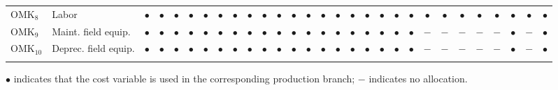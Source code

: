 \documentclass[12pt]{article}
\begin{document}
\begin{table}[H]
\begin{threeparttable}
{\begin{tabular}{llccccccccccccccccccccccccccc}
OMK$_8$    & Labor                 & $\bullet$ & $\bullet$ & $\bullet$ & $\bullet$ & $\bullet$ & $\bullet$ & $\bullet$ & $\bullet$ & $\bullet$ & $\bullet$ & $\bullet$ & $\bullet$ & $\bullet$ & $\bullet$ & $\bullet$ & $\bullet$ & $\bullet$ & $\bullet$ & $\bullet$ & $\bullet$ & $\bullet$ & $\bullet$ & $\bullet$ & $\bullet$ & $\bullet$ & $\bullet$ & $\bullet$ \\
OMK$_9$    & Maint. field equip.    & $\bullet$ & $\bullet$ & $\bullet$ & $\bullet$ & $\bullet$ & $\bullet$ & $\bullet$ & $\bullet$ & $\bullet$ & $\bullet$ & $\bullet$ & $\bullet$ & $\bullet$ & $\bullet$ & $\bullet$ & $\bullet$ & $\bullet$ & $\bullet$ & $\bullet$ & $-$  & $-$  & $-$  & $-$  & $-$  & $\bullet$ & $-$  & $\bullet$ \\
OMK$_{10}$ & Deprec. field equip.   & $\bullet$ & $\bullet$ & $\bullet$ & $\bullet$ & $\bullet$ & $\bullet$ & $\bullet$ & $\bullet$ & $\bullet$ & $\bullet$ & $\bullet$ & $\bullet$ & $\bullet$ & $\bullet$ & $\bullet$ & $\bullet$ & $\bullet$ & $\bullet$ & $\bullet$ & $-$  & $-$  & $-$  & $-$  & $-$  & $\bullet$ & $-$  & $\bullet$ \\
\addlinespace
\bottomrule
\end{tabular}%
}
\begin{tablenotes}
\footnotesize
\item $\bullet$ indicates that the cost variable is used in the corresponding production branch; $-$ indicates no allocation.
\end{tablenotes}
\end{threeparttable}
\end{table}


\newpage
\end{document}
